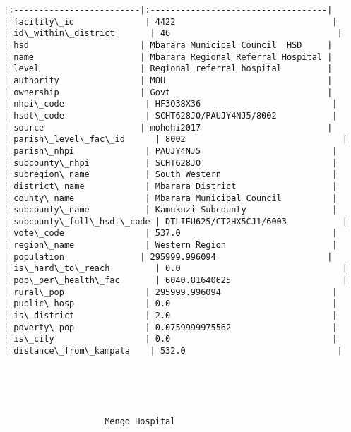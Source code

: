 \documentclass[11pt]{article}
\begin{document}
\begin{Verbatim}[commandchars=\\\{\}]
|:-------------------------|:-----------------------------------|
| facility\_id              | 4422                               |
| id\_within\_district       | 46                                 |
| hsd                      | Mbarara Municipal Council  HSD     |
| name                     | Mbarara Regional Referral Hospital |
| level                    | Regional referral hospital         |
| authority                | MOH                                |
| ownership                | Govt                               |
| nhpi\_code                | HF3Q38X36                          |
| hsdt\_code                | SCHT628J0/PAUJY4NJ5/8002           |
| source                   | mohdhi2017                         |
| parish\_level\_fac\_id      | 8002                               |
| parish\_nhpi              | PAUJY4NJ5                          |
| subcounty\_nhpi           | SCHT628J0                          |
| subregion\_name           | South Western                      |
| district\_name            | Mbarara District                   |
| county\_name              | Mbarara Municipal Council          |
| subcounty\_name           | Kamukuzi Subcounty                 |
| subcounty\_full\_hsdt\_code | DTLIEU625/CT2HX5CJ1/6003           |
| vote\_code                | 537.0                              |
| region\_name              | Western Region                     |
| population               | 295999.996094                      |
| is\_hard\_to\_reach         | 0.0                                |
| pop\_per\_health\_fac       | 6040.81640625                      |
| rural\_pop                | 295999.996094                      |
| public\_hosp              | 0.0                                |
| is\_district              | 2.0                                |
| poverty\_pop              | 0.0759999975562                    |
| is\_city                  | 0.0                                |
| distance\_from\_kampala    | 532.0                              |





                    Mengo Hospital                     


\end{Verbatim}
\end{document}
